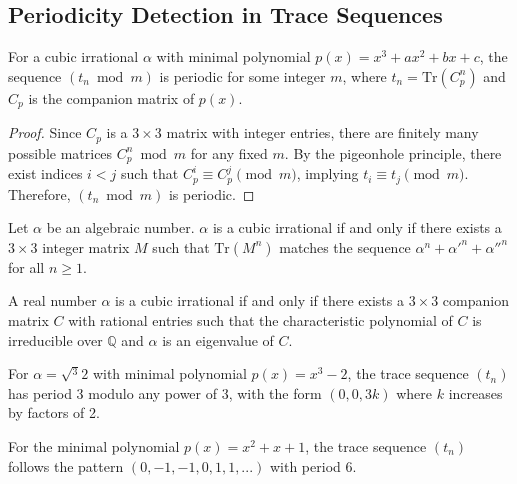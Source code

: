 \subsection{Periodicity Detection in Trace Sequences}

\begin{theorem}
For a cubic irrational $\alpha$ with minimal polynomial $p(x) = x^3 + ax^2 + bx + c$, the sequence $(t_n \bmod m)$ is periodic for some integer $m$, where $t_n = \text{Tr}(C_p^n)$ and $C_p$ is the companion matrix of $p(x)$.
\end{theorem}

\begin{proof}
Since $C_p$ is a $3 \times 3$ matrix with integer entries, there are finitely many possible matrices $C_p^n \bmod m$ for any fixed $m$. By the pigeonhole principle, there exist indices $i < j$ such that $C_p^i \equiv C_p^j \pmod{m}$, implying $t_i \equiv t_j \pmod{m}$. Therefore, $(t_n \bmod m)$ is periodic.
\end{proof}

\begin{theorem}
Let $\alpha$ be an algebraic number. $\alpha$ is a cubic irrational if and only if there exists a $3 \times 3$ integer matrix $M$ such that $\text{Tr}(M^n)$ matches the sequence $\alpha^n + \alpha'^n + \alpha''^n$ for all $n \geq 1$.
\end{theorem}

\begin{theorem}\label{thm:matrix_cubic}
A real number $\alpha$ is a cubic irrational if and only if there exists a $3 \times 3$ companion matrix $C$ with rational entries such that the characteristic polynomial of $C$ is irreducible over $\mathbb{Q}$ and $\alpha$ is an eigenvalue of $C$.
\end{theorem}

\begin{proposition}
For $\alpha = \sqrt{^3}{2}$ with minimal polynomial $p(x) = x^3 - 2$, the trace sequence $(t_n)$ has period 3 modulo any power of 3, with the form $(0, 0, 3k)$ where $k$ increases by factors of 2.
\end{proposition}

\begin{proposition}
For the minimal polynomial $p(x) = x^2 + x + 1$, the trace sequence $(t_n)$ follows the pattern $(0, -1, -1, 0, 1, 1, ...)$ with period 6.
\end{proposition}

